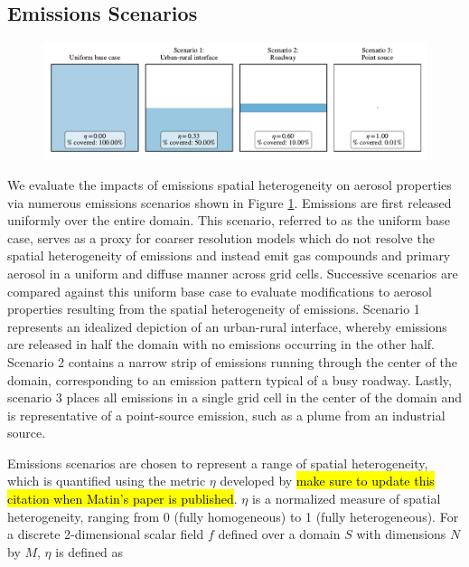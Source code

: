 \documentclass[journal abbreviation, manuscript]{copernicus}
\begin{document}
\subsection{Emissions Scenarios}

\begin{figure}[!t]
	\centering
	\includegraphics[]{figures/SH-scenarios.pdf}
	\caption{}
	\label{fig:sh-scenarios}
\end{figure} 

We evaluate the impacts of emissions spatial heterogeneity on aerosol properties via numerous emissions scenarios shown in Figure \ref{fig:sh-scenarios}. Emissions are first released uniformly over the entire domain. This scenario, referred to as the uniform base case, serves as a proxy for coarser resolution models which do not resolve the spatial heterogeneity of emissions and instead emit gas compounds and primary aerosol in a uniform and diffuse manner across grid cells. Successive scenarios are compared against this uniform base case to evaluate modifications to aerosol properties resulting from the spatial heterogeneity of emissions. Scenario 1 represents an idealized depiction of an urban-rural interface, whereby emissions are released in half the domain with no emissions occurring in the other half. Scenario 2 contains a narrow strip of emissions running through the center of the domain, corresponding to an emission pattern typical of a busy roadway. Lastly, scenario 3 places all emissions in a single grid cell in the center of the domain and is representative of a point-source emission, such as a plume from an industrial source.  

Emissions scenarios are chosen to represent a range of spatial heterogeneity, which is quantified using the metric $\eta$ developed by \citep{mohebalhojeh_2024} \hl{make sure to update this citation when Matin's paper is published}. $\eta$  is a normalized measure of spatial heterogeneity, ranging from 0 (fully homogeneous) to 1 (fully heterogeneous). For a discrete 2-dimensional scalar field $f$ defined over a domain $S$ with dimensions $N$ by $M$, $\eta$ is defined as 
\end{document}
